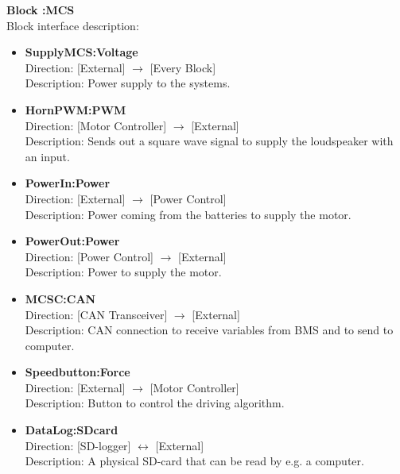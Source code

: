 \textbf{Block :MCS}\\
Block interface description:
\begin{itemize}
	\item \textbf{SupplyMCS:Voltage}\\
	Direction: [External] $\rightarrow$ [Every Block]\\
	Description: Power supply to the systems.
	\item \textbf{HornPWM:PWM}\\
	Direction: [Motor Controller] $\rightarrow$ [External]\\
	Description: Sends out a square wave signal to supply the loudspeaker with an input.
	\item \textbf{PowerIn:Power}\\
	Direction: [External] $\rightarrow$ [Power Control]\\
	Description: Power coming from the batteries to supply the motor.
	\item \textbf{PowerOut:Power}\\
	Direction: [Power Control] $\rightarrow$ [External]\\
	Description: Power to supply the motor.
	\item \textbf{MCSC:CAN}\\
	Direction: [CAN Transceiver] $\rightarrow$ [External]\\
	Description: CAN connection to receive variables from BMS and to send to computer.
	\item \textbf{Speedbutton:Force}\\
	Direction: [External] $\rightarrow$ [Motor Controller]\\
	Description: Button to control the driving algorithm.
	\item \textbf{DataLog:SDcard}\\
	Direction: [SD-logger] $\leftrightarrow$ [External]\\
	Description: A physical SD-card that can be read by e.g. a computer.
\end{itemize}

